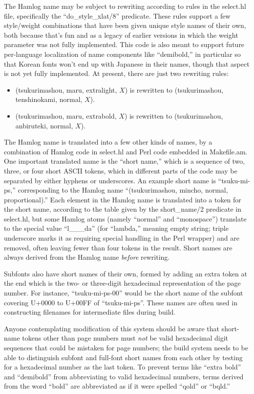 \documentclass[14pt]{extarticle}
\begin{document}
The Hamlog name may be subject to rewriting according to rules in the
select.hl file, specifically the ``do\_style\_xlat/8'' predicate.  These
rules support a few style/weight combinations that have been given unique
style names of their own, both because that's fun and as a legacy of earlier
versions in which the weight parameter was not fully implemented.  This code
is also meant to support future per-language localization of name components
like ``demibold,'' in particular so that Korean fonts won't end up with
Japanese in their names, though that aspect is not yet fully implemented.
At present, there are just two rewriting rules:
\begin{itemize}
  \item (tsukurimashou, maru, extralight, $X$) is rewritten to
    (tsukurimashou, tenshinokami, normal, $X$).
  \item (tsukurimashou, maru, extrabold, $X$) is rewritten to
    (tsukurimashou, anbiruteki, normal, $X$).
\end{itemize}

The Hamlog name is translated into a few other kinds of names, by a
combination of Hamlog code in select.hl and Perl code embedded in
Makefile.am.  One important translated name is the ``short name,'' which is
a sequence of two, three, or four short ASCII tokens, which in different
parts of the code may be separated by either hyphens or underscores.  An
example short name is ``tsuku-mi-ps,'' corresponding to the Hamlog name
``(tsukurimashou, mincho, normal, proportional).'' Each element in the
Hamlog name is translated into a token for the short name, according to the
table given by the short\_name/2 predicate in select.hl, but some Hamlog
atoms (namely ``normal'' and ``monospace'') translate to the special value
``l\_\_\_da'' (for ``lambda,'' meaning empty string; triple underscore marks
it as requiring special handling in the Perl wrapper) and are removed,
often leaving fewer than four tokens in the result.  Short names are always
derived from the Hamlog name \emph{before} rewriting.

Subfonts also have short names of their own, formed by adding an extra token
at the end which is the two- or three-digit hexadecimal representation of
the page number.  For instance, ``tsuku-mi-ps-00'' would be the short name
of the subfont covering U+0000 to U+00FF of ``tsuku-mi-ps''.  These names
are often used in constructing filenames for intermediate files during
build.

Anyone contemplating modification of this system should be aware that
short-name tokens other than page numbers must \emph{not} be valid
hexadecimal digit sequences that could be mistaken for page numbers; the
build system needs to be able to distinguish subfont and full-font short
names from each other by testing for a hexadecimal number as the last
token.  To prevent terms like ``extra bold'' and ``demibold'' from
abbreviating to valid hexadecimal numbers, terms derived from the word
``bold'' are abbreviated as if it were spelled ``qold'' or ``bqld.''
\end{document}
